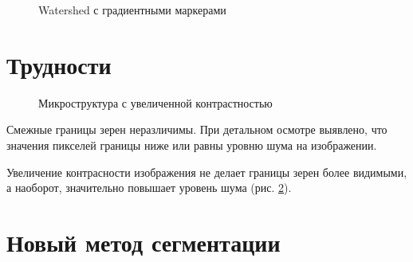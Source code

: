 \documentclass[a4paper, 14pt]{article}
\begin{document}
	
	\begin{figure}[h]
		\caption{Watershed с градиентными маркерами}
		\label{fig:watershed_grad}
	\end{figure}

	
	 
	\section{Трудности}

	\begin{figure}[h]
	\caption{Микроструктура с увеличенной контрастностью}
	\label{fig:noised}
\end{figure}



	
	
 
 		Смежные границы зерен неразличимы. При детальном осмотре выявлено, что значения пикселей границы 
	 ниже или равны уровню шума на изображении.
	 
	 Увеличение контрасности изображения не делает границы зерен более видимыми, а наоборот, значительно 
	 повышает уровень шума (рис. \ref{fig:noised}).
	 		


	\section{Новый метод сегментации}
\end{document}
